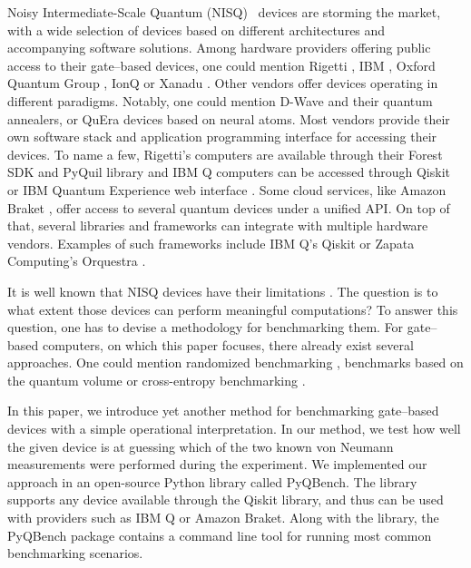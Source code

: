 \documentclass[preprint,12pt, a4paper, dvipsnames]{elsarticle}
\newcommand{\1}{{\rm 1\hspace{-0.9mm}l}}
\theoremstyle{definition}
\begin{document}
Noisy Intermediate-Scale Quantum (NISQ)~\cite{preskill} devices are storming the market,
with a wide selection of devices based on different architectures and accompanying software
solutions. Among hardware providers offering public access to their gate--based devices, one could
mention Rigetti \cite{rigetti}, IBM \cite{ibmq}, Oxford Quantum Group \cite{oxforf}, IonQ \cite{ionq} or Xanadu \cite{xanadu}. Other vendors offer devices operating in
different paradigms. Notably, one could mention D-Wave \cite{dwave} and their quantum
annealers, or QuEra devices \cite{quera} based on neural atoms.  Most vendors provide their own software stack and
application programming interface for accessing their devices. To name a few, Rigetti's computers
are available through their Forest SDK \cite{sdk} and PyQuil library \cite{pyquil} and IBM Q \cite{ibmq} computers can be accessed
through Qiskit \cite{qiskit} or IBM Quantum Experience web interface \cite{ibmqplatform}. Some cloud services, like Amazon Braket \cite{amazon}, offer access to several quantum devices under a unified API. On top of that, several
libraries and frameworks can integrate with multiple hardware vendors. Examples of such frameworks
include IBM Q's Qiskit or Zapata Computing's Orquestra \cite{zapata}.

It is well known that NISQ devices have their limitations \cite{preskillnew}. The question is to what extent those
devices can perform meaningful computations? To answer this question, one has to devise a
methodology for benchmarking them. For gate--based computers, on which this paper focuses, there
already exist several approaches.
One could mention randomized benchmarking \cite{liu2022sampling, knill2007randomized, knill2008randomized, wallman2014randomized, helsen2022general,
	cornelissen2021scalable}, benchmarks based on the quantum volume \cite{cross2019validating, moll2018quantum, pelofske2022volume} or cross-entropy benchmarking \cite{arute2019quantum, neill2018blueprint}.


In this paper, we introduce yet another method for benchmarking gate--based devices with a simple
operational interpretation. In our method, we test how well the given device is at guessing which of
the two known von Neumann measurements were performed during the experiment. We implemented our
approach in an open-source Python library called PyQBench. The library supports any device available
through the Qiskit library, and thus can be used with providers such as IBM Q or Amazon Braket.
Along with the library, the PyQBench package contains a command line tool for running most common
benchmarking scenarios.
\end{document}
